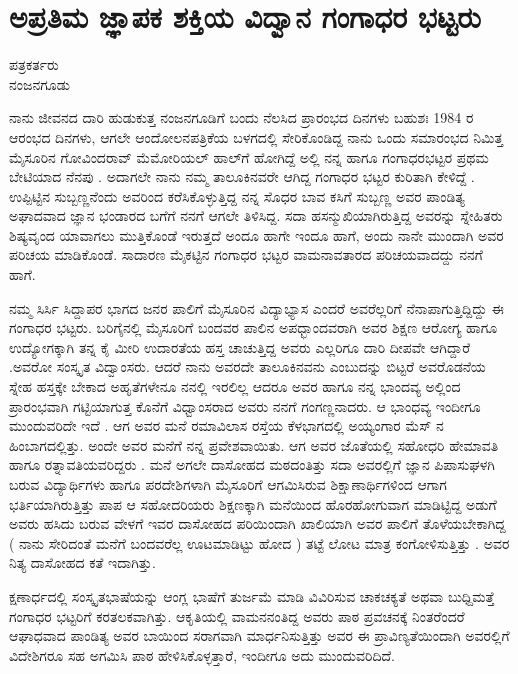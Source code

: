 \chapter{ಅಪ್ರತಿಮ ಜ್ಞಾಪಕ ಶಕ್ತಿಯ ವಿದ್ವಾನ ಗಂಗಾಧರ ಭಟ್ಟರು}

\begin{center}

ಪತ್ರಕರ್ತರು\\  
ನಂಜನಗೂಡು
\addrule
\end{center}

ನಾನು ಜೀವನದ ದಾರಿ ಹುಡುಕುತ್ತ ನಂಜನಗೂಡಿಗೆ ಬಂದು ನೆಲಸಿದ ಪ್ರಾರಂಭದ ದಿನಗಳು ಬಹುಶಃ 1984 ರ ಆರಂಭದ ದಿನಗಳು,  ಆಗಲೇ  ಆಂದೋಲನಪತ್ರಿಕೆಯ ಬಳಗದಲ್ಲಿ ಸೇರಿಕೊಂಡಿದ್ದ ನಾನು ಒಂದು ಸಮಾರಂಭದ ನಿಮಿತ್ತ ಮೈಸೂರಿನ  ಗೋವಿಂದರಾವ್ ಮೆಮೋರಿಯಲ್ ಹಾಲ್‍ಗೆ   ಹೋಗಿದ್ದೆ ಅಲ್ಲಿ ನನ್ನ ಹಾಗೂ ಗಂಗಾಧರಭಟ್ಟರ ಪ್ರಥಮ ಬೇಟಿಯಾದ ನೆನಪು . ಅದಾಗಲೇ ನಾನು ನಮ್ಮ ತಾಲೂಕಿನವರೇ ಆಗಿದ್ದ  ಗಂಗಾಧರ ಭಟ್ಟರ ಕುರಿತಾಗಿ ಕೇಳಿದ್ದೆ .   ಉಪ್ಪಿಟ್ಟಿನ ಸುಬ್ಬಣ್ಣನೆಂದು ಅವರಿಂದ ಕರೆಸಿಕೊಳ್ಳುತ್ತಿದ್ದ ನನ್ನ ಸೊಧರ ಬಾವ ಕಸಿಗೆ ಸುಬ್ಬಣ್ಣ  ಅವರ ಪಾಂಡಿತ್ಯ  ಅಘಾದವಾದ ಜ್ಞಾನ ಭಂಡಾರದ ಬಗೆಗೆ ನನಗೆ ಆಗಲೇ ತಿಳಿಸಿದ್ದ. ಸದಾ  ಹಸನ್ಮುಖಿಯಾಗಿರುತ್ತಿದ್ದ  ಅವರನ್ನು ಸ್ನೇಹಿತರು ಶಿಷ್ಯವೃಂದ ಯಾವಾಗಲು ಮುತ್ತಿಕೊಂಡೆ ಇರುತ್ತದೆ ಅಂದೂ ಹಾಗೇ  ಇಂದೂ ಹಾಗೆ, ಅಂದು ನಾನೇ ಮುಂದಾಗಿ ಅವರ  ಪರಿಚಯ ಮಾಡಿಕೊಂಡೆ.  ಸಾದಾರಣ ಮೈಕಟ್ಟಿನ  ಗಂಗಾಧರ ಭಟ್ಟರ ವಾಮನಾವತಾರದ ಪರಿಚಯವಾದದ್ದು ನನಗೆ ಹಾಗೆ.

ನಮ್ಮ  ಸಿರ್ಸಿ ಸಿದ್ದಾಪರ  ಭಾಗದ ಜನರ ಪಾಲಿಗೆ ಮೈಸೂರಿನ ವಿದ್ಯಾಭ್ಯಾಸ  ಎಂದರೆ ಅವರೆಲ್ಲರಿಗೆ ನೆನಾಪಾಗುತ್ತಿದ್ದಿದ್ದು  ಈ ಗಂಗಾಧರ ಭಟ್ಟರು. ಬರಿಗೈನಲ್ಲಿ ಮೈಸೂರಿಗೆ ಬಂದವರ ಪಾಲಿನ ಅಪಧ್ಭಾಂದವರಾಗಿ  ಅವರ ಶಿಕ್ಷಣ ಆರೋಗ್ಯ ಹಾಗೂ ಉದ್ಯೋಗಕ್ಕಾಗಿ   ತನ್ನ ಕೈ ಮೀರಿ  ಉದಾರತೆಯ ಹಸ್ತ ಚಾಚುತ್ತಿದ್ದ  ಅವರು ಎಲ್ಲರಿಗೂ ದಾರಿ ದೀಪವೇ  ಆಗಿದ್ದಾರೆ .ಅವರೋ ಸಂಸ್ಕೃತ ವಿದ್ವಾಂಸರು. ಆದರೆ ನಾನು  ಅವರದೇ ತಾಲೂಕಿನವನು ಎಂಬುದನ್ನು ಬಿಟ್ಟರೆ  ಅವರೊಡನೆಯ  ಸ್ನೇಹ ಹಸ್ತಕ್ಕೇ ಬೇಕಾದ ಅಹೃತೆಗಳೇನೂ ನನಲ್ಲಿ ಇರಲಿಲ್ಲ   ಆದರೂ  ಅವರ ಹಾಗೂ ನನ್ನ ಭಾಂದವ್ಯ     ಅಲ್ಲಿಂದ ಪ್ರಾರಂಭವಾಗಿ ಗಟ್ಟಿಯಾಗುತ್ತ ಕೊನೆಗೆ ವಿಧ್ವಾಂಸರಾದ ಅವರು  ನನಗೆ ಗಂಗಣ್ಣನಾದರು. ಆ ಭಾಂಧವ್ಯ ಇಂದೀಗೂ ಮುಂದುವರಿದೇ ಇದೆ .  ಆಗ ಅವರ ಮನೆ  ರಮಾವಿಲಾಸ ರಸ್ತೆಯ ಕೆಳಭಾಗದಲ್ಲಿ ಅಯ್ಯಂಗಾರ ಮೆಸ್ ನ ಹಿಂಬಾಗದಲ್ಲಿತ್ತು.   ಅಂದೇ ಅವರ ಮನೆಗೆ ನನ್ನ ಪ್ರವೇಶವಾಯಿತು.  ಆಗ ಅವರ ಜೊತೆಯಲ್ಲಿ ಸಹೋಧರಿ ಹೇಮಾವತಿ ಹಾಗೂ ರತ್ನಾವತಿಯವರಿದ್ದರು  . ಮನೆ ಅಗಲೇ  ದಾಸೋಹದ ಮಠದಂತಿತ್ತು  ಸದಾ ಅವರಲ್ಲಿಗೆ ಜ್ಞಾನ ಪಿಪಾಸುಘಳಗಿ ಬರುವ ವಿದ್ಯಾರ್ಥಿಗಳು ಹಾಗೂ ಪರದೇಶಿಗಳಾಗಿ ಮೈಸೂರಿಗೆ ಆಗಮಿಸಿರುವ ಶಿಕ್ಷಾಣಾರ್ಥಿಗಳಿಂದ   ಆಗಾಗ ಭರ್ತಿಯಾಗಿರುತ್ತಿತ್ತು ಪಾಪ ಆ ಸಹೋದರಿಯರು ಶಿಕ್ಷಣಕ್ಕಾಗಿ ಮನೆಯಿಂದ ಹೊರಹೋಗುವಾಗ   ಮಾಡಿಟ್ಟಿದ್ದ ಅಡುಗೆ ಅವರು ಹಸಿದು ಬರುವ ವೇಳಗೆ ಇವರ ದಾಸೋಹದ ಪರಿಯಿಂದಾಗಿ  ಖಾಲಿಯಾಗಿ ಅವರ ಪಾಲಿಗೆ ತೊಳೆಯಬೇಕಾಗಿದ್ದ ( ನಾನು  ಸೇರಿದಂತೆ ಮನೆಗೆ ಬಂದವರೆಲ್ಲ ಊಟಮಾಡಿಟ್ಟು ಹೋದ )   ತಟ್ಟೆ ಲೋಟ ಮಾತ್ರ ಕಂಗೋಳಿಸುತ್ತಿತ್ತು . ಅವರ ನಿತ್ಯ ದಾಸೋಹದ ಕತೆ ಇದಾಗಿತ್ತು. 

ಕ್ಷಣಾರ್ಧದಲ್ಲಿ  ಸಂಸ್ಕೃತಭಾಷೆಯನ್ನು ಆಂಗ್ಲ ಭಾಷೆಗೆ ತುರ್ಜಮೆ ಮಾಡಿ  ವಿವಿರಿಸುವ ಚಾಕಚಕ್ಯತೆ ಅಥವಾ ಬುಧ್ದಿಮತ್ತೆ ಗಂಗಾಧರ ಭಟ್ಟರಿಗೆ ಕರತಲಕವಾಗಿತ್ತು.  ಆಕೃತಿಯಲ್ಲಿ ವಾಮನನಂತಿದ್ದ ಅವರು ಪಾಠ ಪ್ರವಚನಕ್ಕೆ ನಿಂತರೆಂದರೆ ಆಘಾಧವಾದ ಪಾಂಡಿತ್ಯ ಅವರ ಬಾಯಿಂದ ಸರಾಗವಾಗಿ ಮಾರ್ಧನಿಸುತ್ತಿತ್ತು ಅವರ ಈ ಪ್ರಾವಿಣ್ಯತೆಯಿಂದಾಗಿ  ಅವರಲ್ಲಿಗೆ ವಿದೇಶಿಗರೂ ಸಹ  ಅಗಮಿಸಿ ಪಾಠ ಹೇಳಿಸಿಕೊಳ್ಳತ್ತಾರೆ, ಇಂದೀಗೂ ಅದು ಮುಂದುವರಿದಿದೆ.

